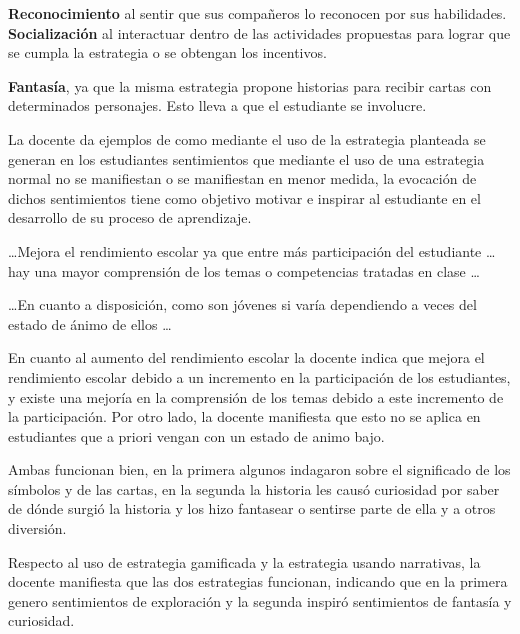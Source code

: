 \begin{displayquote}
	\textbf{Reconocimiento} al sentir que sus compañeros lo reconocen por sus habilidades. 
	\textbf{Socialización} al interactuar dentro de las actividades propuestas para lograr que se cumpla 
	la estrategia o se obtengan los incentivos.

	\textbf{Fantasía}, ya que la misma estrategia propone historias para recibir cartas con determinados 
	personajes. Esto lleva a que el estudiante se involucre.
\end{displayquote}

La docente da ejemplos de como mediante el uso de la estrategia planteada se generan en los estudiantes 
sentimientos que mediante el uso de una estrategia normal no se manifiestan o se manifiestan en menor medida, 
la evocación de dichos sentimientos tiene como objetivo motivar e inspirar al estudiante en el desarrollo de 
su proceso de aprendizaje.

\begin{displayquote}
	\dots Mejora el rendimiento escolar ya que entre más participación del estudiante \dots hay una mayor
	comprensión de los temas o competencias tratadas en clase \dots

	\dots En cuanto a disposición, como son jóvenes si varía dependiendo a veces del estado de ánimo de 
	ellos \dots
\end{displayquote}

En cuanto al aumento del rendimiento escolar la docente indica que mejora el rendimiento escolar debido a un 
incremento en la participación de los estudiantes, y existe una mejoría en la comprensión de los temas debido 
a este incremento de la participación. Por otro lado, la docente manifiesta que esto no se aplica en 
estudiantes que a priori vengan con un estado de animo bajo.

\begin{displayquote}
	Ambas funcionan bien, en la primera algunos indagaron sobre el significado de los símbolos y de las 
	cartas, en la segunda la historia les causó curiosidad por saber de dónde surgió la historia y los 
	hizo fantasear o sentirse parte de ella y a otros diversión.
\end{displayquote}

Respecto al uso de estrategia gamificada y la estrategia usando narrativas, la docente manifiesta que las dos 
estrategias funcionan, indicando que en la primera genero sentimientos de exploración y la segunda inspiró
sentimientos de fantasía y curiosidad.

